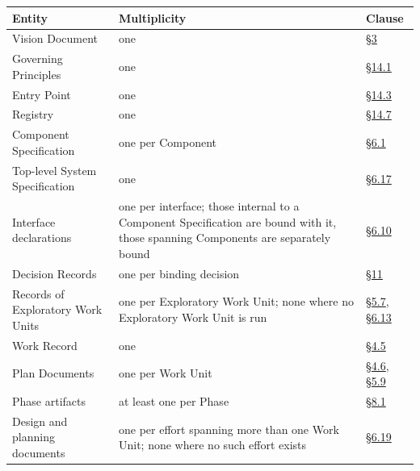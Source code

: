 \begingroup\footnotesize

\begin{longtable}{@{}p{} p{} p{}@{}}

\toprule

\textbf{Entity} & \textbf{Multiplicity} & \textbf{Clause} \\

\midrule

\endhead

Vision Document & one & \hyperlink{nss-3}{\S3} \\

Governing Principles & one & \hyperlink{nss-14.1}{\S14.1} \\

Entry Point & one & \hyperlink{nss-14.3}{\S14.3} \\

Registry & one & \hyperlink{nss-14.7}{\S14.7} \\

Component Specification & one per Component & \hyperlink{nss-6.1}{\S6.1} \\

Top-level System Specification & one & \hyperlink{nss-6.17}{\S6.17} \\

Interface declarations & one per interface; those internal to a Component Specification are bound with it, those spanning Components are separately bound & \hyperlink{nss-6.10}{\S6.10} \\

Decision Records & one per binding decision & \hyperlink{nss-11}{\S11} \\

Records of Exploratory Work Units & one per Exploratory Work Unit; none where no Exploratory Work Unit is run & \hyperlink{nss-5.7}{\S5.7}, \hyperlink{nss-6.13}{\S6.13} \\

Work Record & one & \hyperlink{nss-4.5}{\S4.5} \\

Plan Documents & one per Work Unit & \hyperlink{nss-4.6}{\S4.6}, \hyperlink{nss-5.9}{\S5.9} \\

Phase artifacts & at least one per Phase & \hyperlink{nss-8.1}{\S8.1} \\

Design and planning documents & one per effort spanning more than one Work Unit; none where no such effort exists & \hyperlink{nss-6.19}{\S6.19} \\


\end{longtable}
